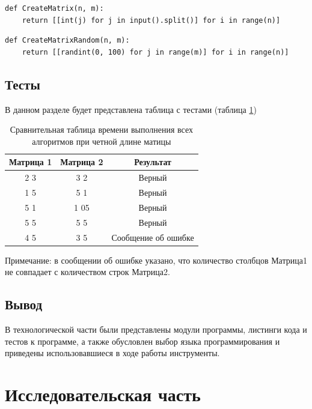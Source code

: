 \documentclass[12pt]{report}
\begin{document}
\begin{lstlisting}[label=some-code,caption=Подпрограмма создания матрицы]
def CreateMatrix(n, m):
    return [[int(j) for j in input().split()] for i in range(n)]
\end{lstlisting}

\begin{lstlisting}[label=some-code,caption=Подпрограмма создания матрицы с использованием функции randint модуля random  \cite{bib4}]
def CreateMatrixRandom(n, m):
    return [[randint(0, 100) for j in range(m)] for i in range(n)]\end{lstlisting}

\section{Тесты}

В данном разделе будет представлена таблица с тестами (таблица \ref{table:ref13})
\begin{table}[ht]
	\centering
	\caption{Сравнительная таблица времени выполнения всех алгоритмов при четной длине матицы}
	\begin{tabular}{|c c c|}
		\hline
		Матрица 1 & Матрица 2 &  Результат \\ [0.5ex] 
 		\hline\hline
		2 3 & 3 2 & Верный\\
 		\hline
 		1 5 & 5 1 & Верный\\
		\hline
		5 1 & 1 05 & Верный\\
 		\hline
 		 5 5 & 5 5 & Верный\\
 		\hline
		4 5 & 3 5 & Сообщение об ошибке\\
		\hline
	\end{tabular}
	\label{table:ref13}
\end{table} 

Примечание: в сообщении об ошибке указано, что количество столбцов Матрица1 не совпадает с количеством строк Матрица2.


\section{Вывод}
В технологической части были представлены модули программы, листинги кода и тестов к программе, а также обусловлен выбор языка программирования и приведены использовавшиеся в ходе работы инструменты.


\chapter{Исследовательская часть}
\end{document}

